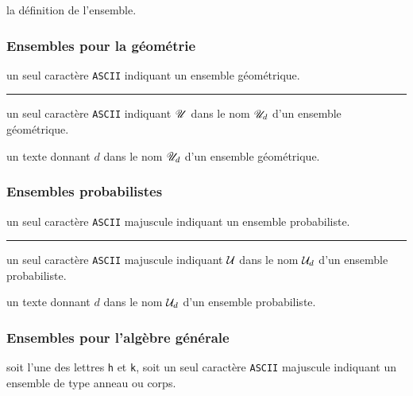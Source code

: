 \documentclass[12pt,a4paper]{book}
\theoremstyle{definition}
\newcommand\separation{
	\medskip
	\hfill\rule{0.5\textwidth}{0.75pt}\hfill
	\medskip
}
\newcommand\ascii{\texttt{ASCII}}
\begin{document}
{{\IDarg{} la définition de l'ensemble.




\subsubsection{Ensembles pour la géométrie} \label{set-geo}




\IDarg{} un seul caractère \ascii{} indiquant un ensemble géométrique.


\separation



 un seul caractère \ascii{} indiquant $\setgeo{U}$ dans le nom $\setgeo*{U}{d}$ d'un ensemble géométrique.

 un texte donnant $d$ dans le nom $\setgeo*{U}{d}$ d'un ensemble géométrique.




\subsubsection{Ensembles probabilistes}




\IDarg{} un seul caractère \ascii{} majuscule indiquant un ensemble probabiliste.


\separation



 un seul caractère \ascii{} majuscule indiquant $\setproba{U}$ dans le nom $\setproba*{U}{d}$ d'un ensemble probabiliste.

 un texte donnant $d$ dans le nom $\setproba*{U}{d}$ d'un ensemble probabiliste.




\subsubsection{Ensembles pour l'algèbre générale}




\IDarg{} soit l'une des lettres  \texttt{h} et \texttt{k}, soit un seul caractère \ascii{} majuscule indiquant un ensemble de type anneau ou corps.


}}
\end{document}
